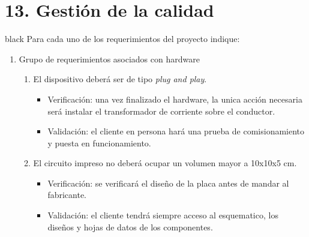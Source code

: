 \documentclass[11pt]{charter}
\begin{document}
\section{13. Gestión de la calidad}
\label{sec:calidad}

\begin{consigna}{black}
Para cada uno de los requerimientos del proyecto indique:
\begin{enumerate}
	\item Grupo de requerimientos asociados con hardware
	\begin{enumerate}[label*=\arabic*.]
			\item El dispositivo deberá ser de tipo \textit{plug and play}.
				\begin{itemize}
					\item Verificación: una vez finalizado el hardware, la unica acción necesaria será instalar el transformador de corriente sobre el conductor.\\
					\item Validación: el cliente en persona hará una prueba de comisionamiento y puesta en funcionamiento.\\
				\end{itemize}
				
			\item El circuito impreso no deberá ocupar un volumen mayor a 10x10x5 cm.
				\begin{itemize}
					\item Verificación: se verificará el diseño de la placa antes de mandar al fabricante.\\
					\item Validación: el cliente tendrá siempre acceso al esquematico, los diseños y hojas de datos de los componentes.\\
				\end{itemize}
				

\end{enumerate}
\end{enumerate}
\end{consigna}
\end{document}
